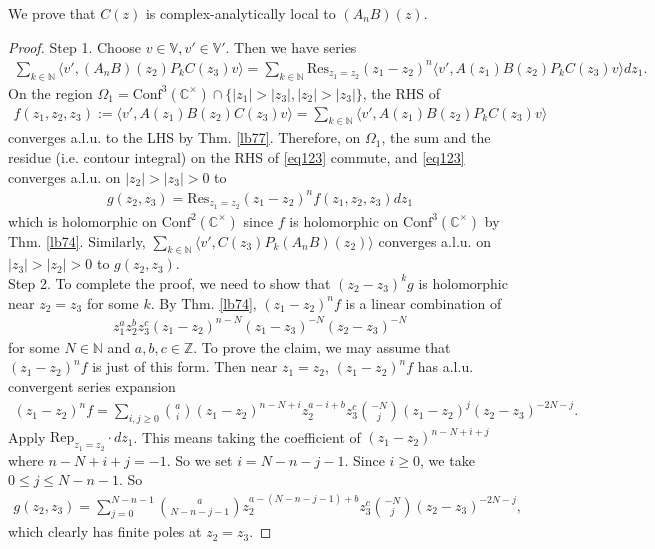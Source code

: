 \documentclass[11pt,b5paper,notitlepage]{article}
\theoremstyle{definition}
\theoremstyle{plain}
\newcommand{\Conf}{\mathrm{Conf}}
\newcommand{\Res}{\mathrm{Res}}
\newcommand{\Rep}{\mathrm{Rep}}
\newcommand{\bk}[1]{\langle {#1}\rangle}
\newcommand{\Vbb}{\mathbb V}
\newcommand{\Cbb}{\mathbb C}
\newcommand{\Nbb}{\mathbb N}
\newcommand{\Zbb}{\mathbb Z}
\numberwithin{equation}{section}
\begin{document}
We prove that $C(z)$ is complex-analytically local to $(A_nB)(z)$. 
\begin{proof}
Step 1. Choose $v\in\Vbb,v'\in\Vbb'$. Then we have series
\begin{align}
\sum_{k\in\Nbb}\bk{v',(A_nB)(z_2)P_kC(z_3)v}=\sum_{k\in\Nbb}\Res_{z_1=z_2}(z_1-z_2)^n\bk{v',A(z_1)B(z_2)P_kC(z_3)v}dz_1.\label{eq123}
\end{align}
On the region  $\Omega_1=\Conf^3(\Cbb^\times)\cap\{|z_1|>|z_3|,|z_2|>|z_3|\}$, the RHS of
\begin{align*}
f(z_1,z_2,z_3):=\bk{v',A(z_1)B(z_2)C(z_3)v}=\sum_{k\in\Nbb}\bk{v',A(z_1)B(z_2)P_kC(z_3)v}	
\end{align*}
converges a.l.u. to the LHS by Thm. \ref{lb77}. Therefore, on $\Omega_1$, the sum and the residue (i.e. contour integral) on the RHS of \eqref{eq123} commute, and \eqref{eq123} converges a.l.u. on $|z_2|>|z_3|>0$ to
\begin{align*}
g(z_2,z_3)=\Res_{z_1=z_2}(z_1-z_2)^nf(z_1,z_2,z_3)dz_1	
\end{align*}
which is holomorphic on $\Conf^2(\Cbb^\times)$ since $f$ is holomorphic on $\Conf^3(\Cbb^\times)$ by Thm. \ref{lb74}. Similarly,  $\sum_{k\in\Nbb}\bk{v',C(z_3)P_k(A_nB)(z_2)}$ converges a.l.u. on $|z_3|>|z_2|>0$ to $g(z_2,z_3)$.\\

Step 2. To complete the proof, we need to show that $(z_2-z_3)^kg$ is holomorphic near $z_2=z_3$ for some $k$. By Thm. \ref{lb74}, $(z_1-z_2)^nf$ is a linear combination of
\begin{align*}
z_1^az_2^bz_3^c(z_1-z_2)^{n-N}(z_1-z_3)^{-N}(z_2-z_3)^{-N}	
\end{align*}
for some $N\in\Nbb$ and $a,b,c\in\Zbb$. To prove the claim, we may assume that $(z_1-z_2)^nf$ is just of this form. Then near $z_1=z_2$, $(z_1-z_2)^nf$ has a.l.u. convergent series expansion
\begin{align*}
(z_1-z_2)^nf=\sum_{i,j\geq0}{a\choose i}(z_1-z_2)^{n-N+i}z_2^{a-i+b}z_3^c{-N\choose j}(z_1-z_2)^j(z_2-z_3)^{-2N-j}.	
\end{align*}
Apply $\Rep_{z_1=z_2}\cdot dz_1$. This means taking the coefficient of $(z_1-z_2)^{n-N+i+j}$ where $n-N+i+j=-1$. So we set $i=N-n-j-1$. Since $i\geq0$, we take $0\leq j\leq N-n-1$. So
\begin{align*}
g(z_2,z_3)=\sum_{j=0}^{N-n-1}	{a\choose N-n-j-1}z_2^{a-(N-n-j-1)+b}z_3^c{-N\choose j}(z_2-z_3)^{-2N-j},
\end{align*}
which clearly has finite poles at $z_2=z_3$.
\end{proof}
\end{document}
